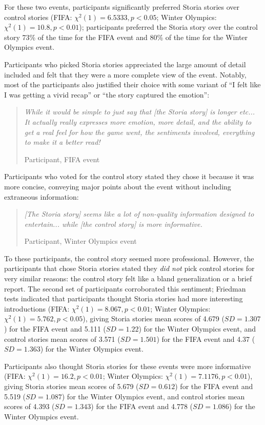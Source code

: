 For these two events, participants significantly preferred Storia stories over control stories (FIFA: $\chi^2(1)=6.5333, p<0.05$; Winter Olympics: $\chi^2(1)=10.8, p<0.01$); participants preferred the Storia story over the control story 73\% of the time for the FIFA event and 80\% of the time for the Winter Olympics event.


Participants who picked Storia stories appreciated the large amount of detail included and felt that they were a more complete view of the event. Notably, most of the participants also justified their choice with some variant of ``I felt like I was getting a vivid recap'' or ``the story captured the emotion'':

\begin{quote}
\emph{While it would be simple to just say that [the Storia story] is longer etc...  It actually really expresses more emotion, more detail, and the ability to get a real feel for how the game went, the sentiments involved, everything to make it a better read!}

Participant, FIFA event
\end{quote}

Participants who voted for the control story stated they chose it because it was more concise, conveying major points about the event without including extraneous information:

\begin{quote}
\emph{[The Storia story] seems like a lot of non-quality information designed to entertain... while [the control story] is more informative.}


Participant, Winter Olympics event
\end{quote}

To these participants, the control story seemed more professional. However, the participants that chose Storia stories stated they \emph{did not} pick control stories for very similar reasons: the control story felt like a bland generalization or a brief report. The second set of participants corroborated this sentiment; Friedman tests indicated that participants thought Storia stories had more interesting introductions (FIFA: $\chi^2(1)=8.067, p<0.01$; Winter Olympics: $\chi^2(1)=5.762, p<0.05$), giving Storia stories mean scores of 4.679 ($SD=1.307$) for the FIFA event and 5.111 ($SD=1.22$) for the Winter Olympics event, and control stories mean scores of 3.571 ($SD=1.501$) for the FIFA event and 4.37 ($SD=1.363$) for the Winter Olympics event.

Participants also thought Storia stories for these events were more informative (FIFA: $\chi^2(1)=16.2, p<0.01$; Winter Olympics: $\chi^2(1)=7.1176, p<0.01$), giving Storia stories mean scores of 5.679 ($SD=0.612$) for the FIFA event and 5.519 ($SD=1.087$) for the Winter Olympics event, and control stories mean scores of 4.393 ($SD=1.343$) for the FIFA event and 4.778 ($SD=1.086$) for the Winter Olympics event.

